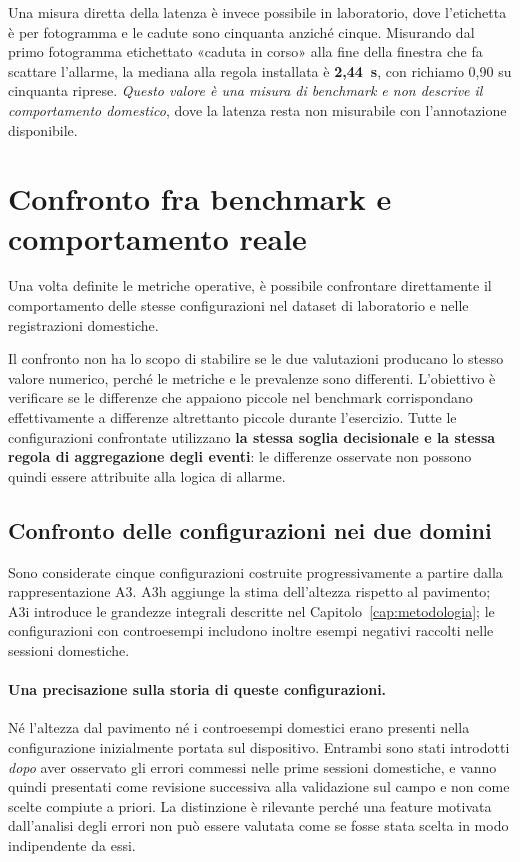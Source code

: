 Una misura diretta della latenza è invece possibile in laboratorio, dove l'etichetta è per fotogramma e le cadute sono cinquanta anziché cinque. Misurando dal primo fotogramma etichettato «caduta in corso» alla fine della finestra che fa scattare l'allarme, la mediana alla regola installata è \textbf{2,44~s}, con richiamo 0,90 su cinquanta riprese. \emph{Questo valore è una misura di benchmark e non descrive il comportamento domestico}, dove la latenza resta non misurabile con l'annotazione disponibile.

\section{Confronto fra benchmark e comportamento reale}
\label{sec:rovesciamento}

Una volta definite le metriche operative, è possibile confrontare direttamente il comportamento delle stesse configurazioni nel dataset di laboratorio e nelle registrazioni domestiche.

Il confronto non ha lo scopo di stabilire se le due valutazioni producano lo stesso valore numerico, perché le metriche e le prevalenze sono differenti. L'obiettivo è verificare se le differenze che appaiono piccole nel benchmark corrispondano effettivamente a differenze altrettanto piccole durante l'esercizio. Tutte le configurazioni confrontate utilizzano \textbf{la stessa soglia decisionale e la stessa regola di aggregazione degli eventi}: le differenze osservate non possono quindi essere attribuite alla logica di allarme.

\subsection{Confronto delle configurazioni nei due domini}

Sono considerate cinque configurazioni costruite progressivamente a partire dalla rappresentazione A3. A3h aggiunge la stima dell'altezza rispetto al pavimento; A3i introduce le grandezze integrali descritte nel Capitolo~\ref{cap:metodologia}; le configurazioni con controesempi includono inoltre esempi negativi raccolti nelle sessioni domestiche.

\paragraph{Una precisazione sulla storia di queste configurazioni.} Né l'altezza dal pavimento né i controesempi domestici erano presenti nella configurazione inizialmente portata sul dispositivo. Entrambi sono stati introdotti \emph{dopo} aver osservato gli errori commessi nelle prime sessioni domestiche, e vanno quindi presentati come revisione successiva alla validazione sul campo e non come scelte compiute a priori. La distinzione è rilevante perché una feature motivata dall'analisi degli errori non può essere valutata come se fosse stata scelta in modo indipendente da essi.

